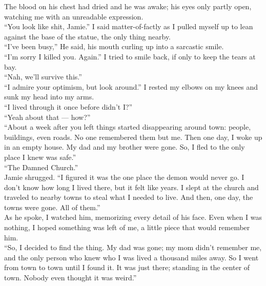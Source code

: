 \documentclass[a5paper]{scrartcl}
\begin{document}
The blood on his chest had dried and he was awake; his eyes only partly open, watching me with an unreadable expression.\\


\enquote{You look like shit, Jamie.} I said matter-of-factly as I pulled myself up to lean against the base of the statue, the only thing nearby.\\


\enquote{I've been busy,} He said, his mouth curling up into a sarcastic smile.\\


\enquote{I'm sorry I killed you. Again.} I tried to smile back, if only to keep the tears at bay.\\


\enquote{Nah, we'll survive this.}\\


\enquote{I admire your optimism, but look around.} I rested my elbows on my knees and sunk my head into my arms.\\


\enquote{I lived through it once before didn't I?}\\


\enquote{Yeah about that --- how?}\\


\enquote{About a week after you left things started disappearing around town: people, buildings, even roads. No one remembered them but me. Then one day, I woke up in an empty house. My dad and my brother were gone. So, I fled to the only place I knew was safe.}\\


\enquote{The Damned Church.}\\


Jamie shrugged. \enquote{I figured it was the one place the demon would never go. I don't know how long I lived there, but it felt like years. I slept at the church and traveled to nearby towns to steal what I needed to live. And then, one day, the towns were gone. All of them.}\\


As he spoke, I watched him, memorizing every detail of his face. Even when I was nothing, I hoped something was left of me, a little piece that would remember him.\\


\enquote{So, I decided to find the thing. My dad was gone; my mom didn't remember me, and the only person who knew who I was lived a thousand miles away. So I went from town to town until I found it. It was just there; standing in the center of town. Nobody even thought it was weird.}\\
\end{document}
